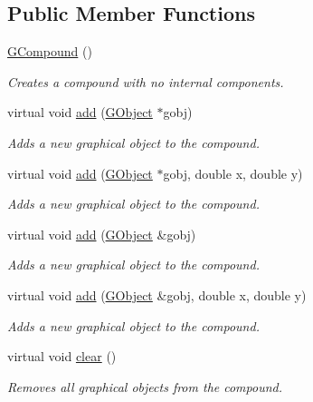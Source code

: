 \subsection*{Public Member Functions}
\begin{DoxyCompactItemize}
\item 
\mbox{\hyperlink{classGCompound_a96d2773de31d81df96135d8621cf47df}{G\+Compound}} ()
\begin{DoxyCompactList}\small\item\em Creates a compound with no internal components. \end{DoxyCompactList}\item 
virtual void \mbox{\hyperlink{classGCompound_afe8277e7b2627513c6f7452fb0b2847d}{add}} (\mbox{\hyperlink{classGObject}{G\+Object}} $\ast$gobj)
\begin{DoxyCompactList}\small\item\em Adds a new graphical object to the compound. \end{DoxyCompactList}\item 
virtual void \mbox{\hyperlink{classGCompound_a8bb36f245efc7806414a1339c2befa1c}{add}} (\mbox{\hyperlink{classGObject}{G\+Object}} $\ast$gobj, double x, double y)
\begin{DoxyCompactList}\small\item\em Adds a new graphical object to the compound. \end{DoxyCompactList}\item 
virtual void \mbox{\hyperlink{classGCompound_ac732fc2123d7a6d7e2de145fe9bbd8e8}{add}} (\mbox{\hyperlink{classGObject}{G\+Object}} \&gobj)
\begin{DoxyCompactList}\small\item\em Adds a new graphical object to the compound. \end{DoxyCompactList}\item 
virtual void \mbox{\hyperlink{classGCompound_a5b11b532869632a6c26b098b0858eac5}{add}} (\mbox{\hyperlink{classGObject}{G\+Object}} \&gobj, double x, double y)
\begin{DoxyCompactList}\small\item\em Adds a new graphical object to the compound. \end{DoxyCompactList}\item 
virtual void \mbox{\hyperlink{classGCompound_ac8bb3912a3ce86b15842e79d0b421204}{clear}} ()
\begin{DoxyCompactList}\small\item\em Removes all graphical objects from the compound. \end{DoxyCompactList}\item 

\end{DoxyCompactItemize}
